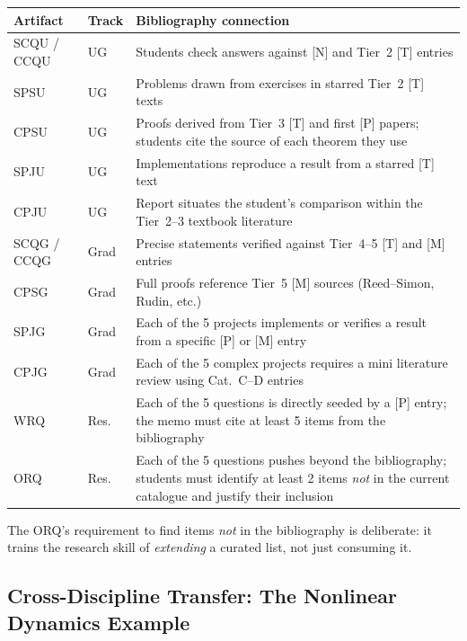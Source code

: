 \documentclass[11pt,a4paper]{article}
\begin{document}
\begin{center}
\begin{tabularx}{\textwidth}{llX}
\toprule
\textbf{Artifact} & \textbf{Track} & \textbf{Bibliography connection}\\
\midrule
SCQU / CCQU & UG    & Students check answers against [N] and Tier~2 [T] entries\\
SPSU        & UG    & Problems drawn from exercises in starred Tier~2 [T] texts\\
CPSU        & UG    & Proofs derived from Tier~3 [T] and first [P] papers;
                      students cite the source of each theorem they use\\
SPJU        & UG    & Implementations reproduce a result from a starred [T] text\\
CPJU        & UG    & Report situates the student's comparison within the
                      Tier~2--3 textbook literature\\
SCQG / CCQG & Grad  & Precise statements verified against Tier~4--5 [T] and [M] entries\\
CPSG        & Grad  & Full proofs reference Tier~5 [M] sources (Reed--Simon, Rudin, etc.)\\
SPJG        & Grad  & Each of the 5 projects implements or verifies a result from
                      a specific [P] or [M] entry\\
CPJG        & Grad  & Each of the 5 complex projects requires a mini literature review
                      using Cat.~C--D entries\\
WRQ         & Res.  & Each of the 5 questions is directly seeded by a [P] entry;
                      the memo must cite at least 5 items from the bibliography\\
ORQ         & Res.  & Each of the 5 questions pushes beyond the bibliography;
                      students must identify at least 2 items \emph{not} in the
                      current catalogue and justify their inclusion\\
\bottomrule
\end{tabularx}
\end{center}

\medskip
\noindent The ORQ's requirement to find items \emph{not} in the bibliography is
deliberate: it trains the research skill of \emph{extending} a curated list, not
just consuming it.

\subsection{Cross-Discipline Transfer: The Nonlinear Dynamics Example}
\end{document}
